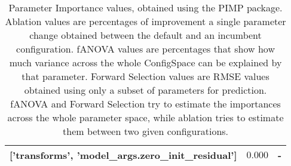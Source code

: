 \begin{table}
\begin{tabular}{r|r|r}
['transforms', 'model_args.zero_init_residual']              & $ 0.000$ &      -\\
\bottomrule
\end{tabular}
\caption{Parameter Importance values, obtained using the PIMP package. Ablation values are percentages of improvement a single parameter change obtained between the default and an incumbent configuration.
fANOVA values are percentages that show how much variance across the whole ConfigSpace can be explained by that parameter.
Forward Selection values are RMSE values obtained using only a subset of parameters for prediction.
fANOVA and Forward Selection try to estimate the importances across the whole parameter space, while ablation tries to estimate them between two given configurations.}
\label{tab:pimp}
\end{table}
